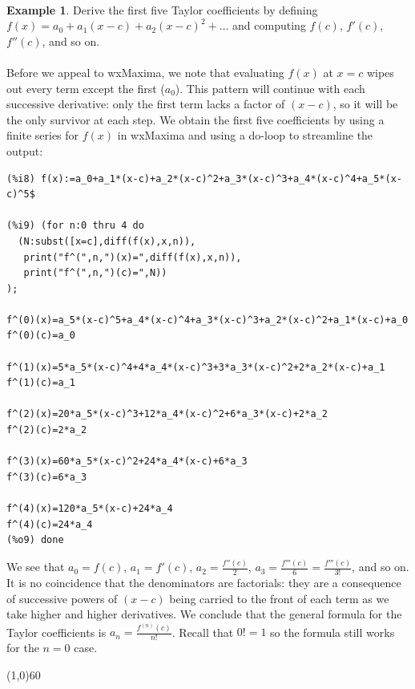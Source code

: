 \documentclass[10.5pt,twoside]{report}
\theoremstyle{definition}
\newtheorem{exmp}{Example}[section]
\begin{document}
${}$\\

\begin{exmp} Derive the first five Taylor coefficients by defining $f(x)=a_0+a_1(x-c)+a_2(x-c)^2+\dots$ and computing $f(c)$, $f'(c)$, $f''(c)$, and so on.\\
${}$\\
Before we appeal to wxMaxima, we note that evaluating $f(x)$ at $x=c$ wipes out every term except the first ($a_0$).  This pattern will continue with each successive derivative:  only the first term lacks a factor of $(x-c)$, so it will be the only survivor at each step.  We obtain the first five coefficients by using a finite series for $f(x)$ in wxMaxima and using a do-loop to streamline the output:

\begin{verbatim}
(%i8) f(x):=a_0+a_1*(x-c)+a_2*(x-c)^2+a_3*(x-c)^3+a_4*(x-c)^4+a_5*(x-c)^5$

(%i9) (for n:0 thru 4 do
  (N:subst([x=c],diff(f(x),x,n)),
   print("f^(",n,")(x)=",diff(f(x),x,n)),
   print("f^(",n,")(c)=",N))
);

f^(0)(x)=a_5*(x-c)^5+a_4*(x-c)^4+a_3*(x-c)^3+a_2*(x-c)^2+a_1*(x-c)+a_0
f^(0)(c)=a_0

f^(1)(x)=5*a_5*(x-c)^4+4*a_4*(x-c)^3+3*a_3*(x-c)^2+2*a_2*(x-c)+a_1
f^(1)(c)=a_1

f^(2)(x)=20*a_5*(x-c)^3+12*a_4*(x-c)^2+6*a_3*(x-c)+2*a_2
f^(2)(c)=2*a_2

f^(3)(x)=60*a_5*(x-c)^2+24*a_4*(x-c)+6*a_3
f^(3)(c)=6*a_3

f^(4)(x)=120*a_5*(x-c)+24*a_4
f^(4)(c)=24*a_4
(%o9) done
\end{verbatim}

We see that $a_0 = f(c)$, $a_1 = f'(c)$, $a_2=\frac{f''(c)}{2}$, $a_3=\frac{f'''(c)}{6}=\frac{f'''(c)}{3!}$, and so on.  It is no coincidence that the denominators are factorials:  they are a consequence of successive powers of $(x-c)$ being carried to the front of each term as we take higher and higher derivatives.  We conclude that the general formula for the Taylor coefficients is $a_n = \frac{f^{(n)}(c)}{n!}$.  Recall that $0!=1$ so the formula still works for the $n=0$ case.

\end{exmp}

\line(1,0){60}
\linethickness{0.5mm}
\end{document}

